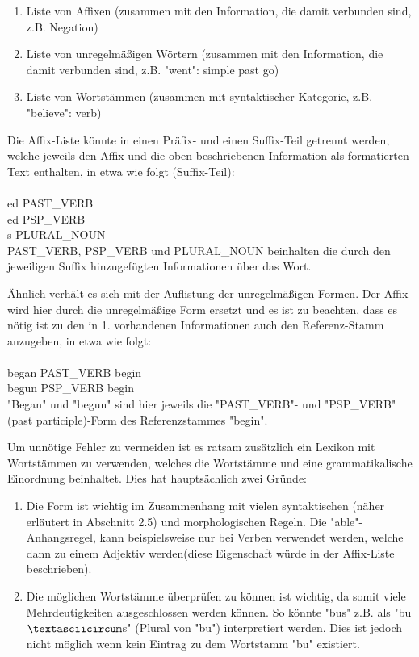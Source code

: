 \documentclass[12pt]{article}
\begin{document}
\begin{enumerate}
\item Liste von Affixen (zusammen mit den Information, die damit verbunden sind, z.B. Negation)
\item Liste von unregelmäßigen Wörtern (zusammen mit den Information, die damit verbunden sind, z.B. "went": simple past go)
\item Liste von Wortstämmen (zusammen mit syntaktischer Kategorie, z.B. "believe": verb)
\end{enumerate}

Die Affix-Liste könnte in einen Präfix- und einen Suffix-Teil getrennt werden, welche jeweils den Affix und die oben beschriebenen Information als formatierten Text enthalten, in etwa wie folgt (Suffix-Teil):
\\
\\
ed PAST\_VERB\\
ed PSP\_VERB\\
s PLURAL\_NOUN\\

PAST\_VERB, PSP\_VERB und PLURAL\_NOUN beinhalten die durch den jeweiligen Suffix hinzugefügten Informationen über das Wort. 

Ähnlich verhält es sich mit der Auflistung der unregelmäßigen Formen. Der Affix wird hier durch die unregelmäßige Form ersetzt und es ist zu beachten, dass es nötig ist zu den in 1. vorhandenen Informationen auch den Referenz-Stamm anzugeben, in etwa wie folgt:
\\
\\
began PAST\_VERB begin\\
begun PSP\_VERB begin\\

"Began" und "begun" sind hier jeweils die "PAST\_VERB"- und "PSP\_VERB"(past participle)-Form des Referenzstammes "begin".

Um unnötige Fehler zu vermeiden ist es ratsam zusätzlich ein Lexikon mit Wortstämmen zu verwenden, welches die Wortstämme und eine grammatikalische Einordnung beinhaltet. Dies hat hauptsächlich zwei Gründe: 

\begin{enumerate}
\item Die Form ist wichtig im Zusammenhang mit vielen syntaktischen (näher erläutert in Abschnitt 2.5) und morphologischen Regeln. Die "able"-Anhangsregel, kann beispielsweise nur bei Verben verwendet werden, welche dann zu einem Adjektiv werden(diese Eigenschaft würde in der Affix-Liste beschrieben).
\item Die möglichen Wortstämme überprüfen zu können ist wichtig, da somit viele Mehrdeutigkeiten ausgeschlossen werden können. So könnte "bus" z.B. als "bu$\textasciicircum$s" (Plural von "bu") interpretiert werden. Dies ist jedoch nicht möglich wenn kein Eintrag zu dem Wortstamm "bu" existiert. 
\end{enumerate}
\end{document}
